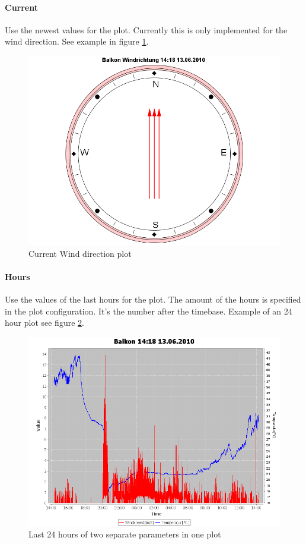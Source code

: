 \paragraph{Current} %
\label{par:current}
Use the newest values for the plot. Currently this is only implemented for the wind direction. See example in figure \ref{fig:current}.
\begin{figure}[ht]
    \centering
    \includegraphics[width=0.9\linewidth]{master/plot_examplec.png}
    \caption{Current Wind direction plot}
    \label{fig:current}
\end{figure}

\paragraph{Hours} %
\label{par:hours}
Use the values of the last hours for the plot. The amount of the hours is specified in the plot configuration. It's the number after the timebase. Example of an 24 hour plot see figure \ref{fig:hours}.
\begin{figure}[ht]
    \centering
    \includegraphics[width=0.9\linewidth]{master/plot_exampleh.png}
    \caption{Last 24 hours of two separate parameters in one plot}
    \label{fig:hours}
\end{figure}

